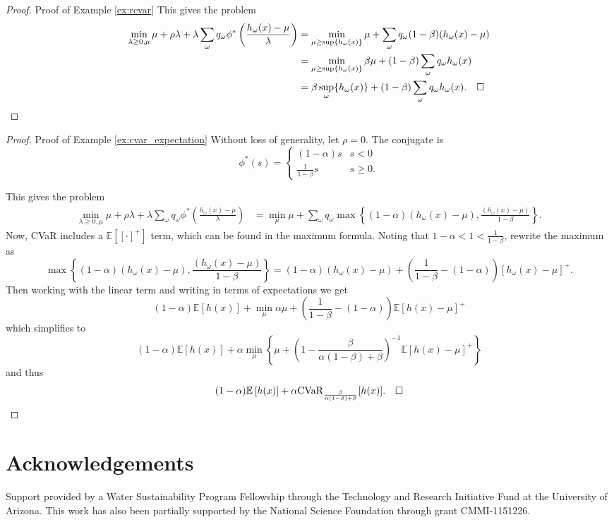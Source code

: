 \documentclass[opre,nonblindrev]{informs3} %
\newcommand{\E}{\mathbb{E}}
\newcommand{\e}[1]{\E \left[ #1 \right]}
\begin{document}
\begin{APPENDICES}
\begin{proof}{\sc Proof of Example \ref{ex:rcvar}}
	This gives the problem
	\begin{align*}
		\min_{\lambda \geq 0,\mu} \mu + \rho \lambda + \lambda \sum_\omega q_\omega \phi^*\left(\frac{h_\omega(x)-\mu}{\lambda}\right) & = \min_{\mu \geq \sup\{h_\omega(x)\}} \mu + \sum_\omega q_\omega (1-\beta) (h_\omega(x) - \mu) \\
		& = \min_{\mu \geq \sup\{h_\omega(x)\}} \beta \mu + (1-\beta) \sum_\omega q_\omega h_\omega(x) \\
		& = \beta \sup_\omega\{h_\omega(x)\} + (1-\beta) \sum_\omega q_\omega h_\omega(x). \mbox{\quad$\square$}
	\end{align*}
\end{proof}

\begin{proof}{\sc Proof of Example \ref{ex:cvar_expectation}}
	Without loss of generality, let $\rho = 0$.
	The conjugate is
	\[
		\phi^*(s) =
		\begin{cases}
			(1-\alpha) s & s < 0 \\
			\frac{1}{1-\beta} s & s \geq 0.
		\end{cases}
	\]
	
	This gives the problem
	\begin{align*}
		\min_{\lambda \geq 0,\mu} \mu + \rho \lambda + \lambda \sum_\omega q_\omega \phi^*\left(\frac{h_\omega(x)-\mu}{\lambda}\right) & = \min_\mu \mu + \sum_\omega q_\omega \max \left\{ (1-\alpha)(h_\omega(x)-\mu), \frac{(h_\omega(x)-\mu)}{1-\beta} \right\}.
	\end{align*}
	Now, CVaR includes a $\e{[\cdot]^+}$ term, which can be found in the maximum formula.
	Noting that $1-\alpha < 1 < \frac{1}{1-\beta}$, rewrite the maximum as
	\[
		\max \left\{ (1-\alpha)(h_\omega(x)-\mu), \frac{(h_\omega(x)-\mu)}{1-\beta} \right\} = (1-\alpha)(h_\omega(x)-\mu) + \left( \frac{1}{1-\beta} - (1-\alpha) \right) \left[ h_\omega(x)-\mu \right]^+.
	\]
	Then working with the linear term and writing in terms of expectations we get
	\[
		(1-\alpha)\e{h(x)} + \min_\mu \alpha\mu + \left( \frac{1}{1-\beta} - (1-\alpha) \right) \e{h(x)-\mu}^+
	\]
	which simplifies to
	\[
		(1-\alpha)\e{h(x)} + \alpha \min_\mu \left\{ \mu + \left(1 - \frac{\beta}{\alpha(1-\beta)+\beta}\right)^{-1} \e{h(x)-\mu}^+ \right\}
	\]
	and thus
	\[
		(1-\alpha)\e{h(x)} + \alpha \mbox{CVaR}_{\frac{\beta}{\alpha(1-\beta)+\beta}}[h(x)]. \Halmos
	\]
\end{proof}

\end{APPENDICES}

\section*{Acknowledgements}
Support provided by a Water Sustainability Program Fellowship through the Technology and Research Initiative Fund at the University of Arizona.
This work has also been partially supported by the National Science Foundation through grant CMMI-1151226.
\end{document}
